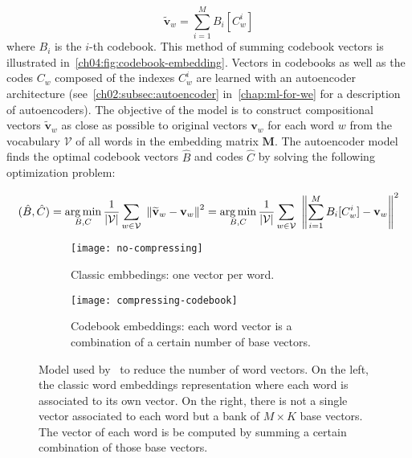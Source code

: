     \begin{equation}
      \widetilde{\mathbf{v}}_w = \sum_{i=1}^M B_i[C^i_w]
    \end{equation}
    where $B_i$ is the $i$-th codebook. This method of summing codebook vectors
    is illustrated in~\autoref{ch04:fig:codebook-embedding}. Vectors in
    codebooks as well as the codes $C_w$ composed of the indexes $C^i_w$ are
    learned with an autoencoder architecture
    (see~\autoref{ch02:subsec:autoencoder} in~\autoref{chap:ml-for-we} for a
    description of autoencoders). The objective of the model is to construct
    compositional vectors $\widetilde{\mathbf{v}}_w$ as close as possible to
    original vectors $\mathbf{v}_w$ for each word $w$ from the vocabulary
    $\mathcal{V}$ of all words in the embedding matrix $\mathbf{M}$. The
    autoencoder model finds the optimal codebook vectors $\hat{B}$ and codes
    $\hat{C}$ by solving the following optimization problem:

    \begin{equation}
      (\hat{B}, \hat{C}) = \operatorname*{arg\,min}_{B, C} \frac{1}{|\mathcal{V}|}
      \sum_{w \in \mathcal{V}}~
      {\left\lVert \widetilde{\mathbf{v}}_w - \mathbf{v}_w \right\rVert}^2
                         = \operatorname*{arg\,min}_{B, C} \frac{1}{|\mathcal{V}|}
      \sum_{w \in \mathcal{V}}~
      {\left\lVert \sum_{i=1}^M B_i[C^i_w] - \mathbf{v}_w \right\rVert}^2
    \end{equation}
    \medskip

    \begin{figure}[t]
      \centering
      \begin{subfigure}[t]{0.49\textwidth}
        \centering
        \texttt{[image: no-compressing]}
        \caption{Classic embbedings: one vector per word.}
      \end{subfigure} \hfill
      \begin{subfigure}[t]{0.49\textwidth}
        \centering
        \texttt{[image: compressing-codebook]}
        \caption{Codebook embeddings: each word vector is a combination of a
        certain number of base vectors.}
      \end{subfigure}
      \caption[Model used by~\citeauthor{shu2018compressing} to reduce the
      number of word vectors.]{Model used by~\citep{shu2018compressing} to
      reduce the number of word vectors. On the left, the classic word
      embeddings representation where each word is associated to its own vector.
      On the right, there is not a single vector associated to each word but a
      bank of $M \times K$ base vectors. The vector of each word is be computed
      by summing a certain combination of those base vectors.}
      \label{ch04:fig:codebook-embedding}
    \end{figure}

